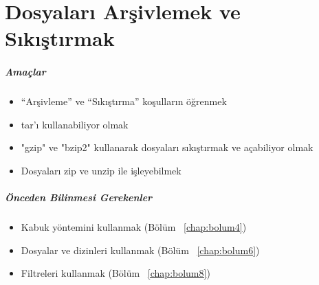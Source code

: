 \chapter{Dosyaları Arşivlemek ve Sıkıştırmak}
\label{chap:bolum11}
\paragraph{Amaçlar}
\begin{itemize}
 \item “Arşivleme” ve “Sıkıştırma” koşulların öğrenmek
 \item tar'ı kullanabiliyor olmak
 \item "gzip" ve "bzip2" kullanarak dosyaları sıkıştırmak ve açabiliyor olmak
 \item Dosyaları zip ve unzip ile işleyebilmek
 \end{itemize}
\paragraph{Önceden Bilinmesi Gerekenler}
\begin{itemize}
 \item Kabuk yöntemini kullanmak (Bölüm ~\ref{chap:bolum4})
 \item Dosyalar ve dizinleri kullanmak (Bölüm ~\ref{chap:bolum6})
 \item Filtreleri kullanmak (Bölüm ~\ref{chap:bolum8})
 \end{itemize}

